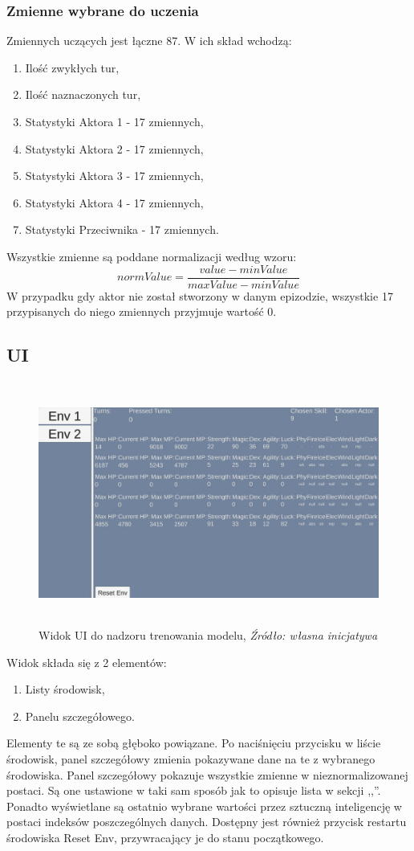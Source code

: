 \documentclass{SGGW-thesis}
\begin{document}
\subsubsection{Zmienne wybrane do uczenia}
\label{zmienne}
Zmiennych uczących jest łączne 87. W ich skład wchodzą:
\begin{enumerate}
  \item{Ilość zwykłych tur},
  \item{Ilość naznaczonych tur},
  \item{Statystyki Aktora 1 - 17 zmiennych},
  \item{Statystyki Aktora 2 - 17 zmiennych},
  \item{Statystyki Aktora 3 - 17 zmiennych},
  \item{Statystyki Aktora 4 - 17 zmiennych},
  \item{Statystyki Przeciwnika - 17 zmiennych}.
\end{enumerate}
Wszystkie zmienne są poddane normalizacji według wzoru:
\[normValue = \frac{value-minValue}{maxValue-minValue}\]
W przypadku gdy aktor nie został stworzony w danym epizodzie, wszystkie 17 przypisanych do niego zmiennych przyjmuje wartość 0.
\subsection{UI}
\begin{figure}[H]
  \centering
  \includegraphics[height=8cm]{trainingui.JPG}
  \caption{Widok UI do nadzoru trenowania modelu, \textit{Źródło: własna inicjatywa}}
\end{figure}
\pagebreak
Widok składa się z 2 elementów:
\begin{enumerate}
  \item{Listy środowisk},
  \item{Panelu szczegółowego}.
\end{enumerate}
Elementy te są ze sobą głęboko powiązane. Po naciśnięciu przycisku w liście środowisk, panel szczegółowy zmienia pokazywane dane na te z wybranego środowiska.
Panel szczegółowy pokazuje wszystkie zmienne w nieznormalizowanej postaci. Są one ustawione w taki sam sposób jak to opisuje lista w sekcji ,,''.
Ponadto wyświetlane są ostatnio wybrane wartości przez sztuczną inteligencję w postaci indeksów poszczególnych danych. Dostępny jest również przycisk restartu
środowiska Reset Env, przywracający je do stanu początkowego.
\end{document}
